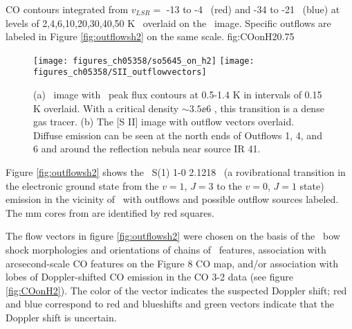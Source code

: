  {CO contours integrated from $v_{LSR}=$ -13 to -4
\kms\ (red) and -34 to -21 \kms\ (blue) at levels of 2,4,6,10,20,30,40,50 K
\kms\ overlaid on the \hh\ image.  Specific outflows are labeled in Figure
\ref{fig:outflowsh2} on the same scale.} {fig:COonH2}{0.75}{}

\begin{figure*}[htpb]
    \hspace{-0.6in}
  \texttt{[image: figures\_ch05358/so5645\_on\_h2]}
  \texttt{[image: figures\_ch05358/SII\_outflowvectors]}
  \caption{(a) \hh\ image with \so\ peak flux contours at 0.5-1.4 K in intervals of 0.15 K
  overlaid.  With a critical density $\sim3.5\ee{6}$ \citep{leidendb}, this
  transition is a dense gas tracer.  (b) The [S II] image with outflow vectors overlaid.
  Diffuse emission can be seen at the north ends of Outflows 1, 4, and 6 and around the
  reflection nebula near source IR 41.} 
  \label{fig:so_on_h2}
\end{figure*}



\label{sec:outflows}

Figure \ref{fig:outflowsh2} shows the \htwo\ S(1) 1-0 2.1218 \um\ (a rovibrational
transition in the electronic ground state from the $v=1$, $J=3$ to the $v=0$,
$J=1$ state) emission in the vicinity of \region\ with outflows and possible
outflow sources labeled.  The mm cores from \citet{beuther2002} are identified
by red squares.  

The flow vectors in figure \ref{fig:outflowsh2} were chosen on the basis of the
\htwo\ bow shock morphologies and orientations of chains of \htwo\ features,
association with arcsecond-scale CO features on the \citet{beuther2002} Figure
8 CO map, and/or association with lobes of Doppler-shifted CO emission in the
CO 3-2 data (see figure \ref{fig:COonH2}).  The color of the vector indicates
the suspected Doppler shift; red and blue correspond to red and blueshifts and
green vectors indicate that the Doppler shift is uncertain.    
 
